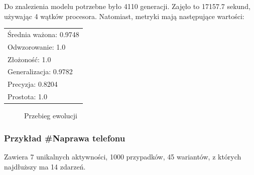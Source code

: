 Do znalezienia modelu potrzebne było 4110 generacji. Zajęło to 17157.7 sekund, używając 4 wątków procesora. Natomiast, metryki mają następujące wartości: 

 \begin{center}
  \begin{tabular}{l}
	Średnia ważona: 0.9748 \\
	Odwzorowanie: 1.0 \\
	Złożoność: 1.0 \\
	Generalizacja: 0.9782 \\
	Precyzja: 0.8204 \\
	Prostota: 1.0
  \end{tabular}
 \end{center}
 
\begin{figure}[H]
	\caption{\label{fig:flow_chart}Przebieg ewolucji}
\end{figure}

\subsubsection{Przykład \#Naprawa telefonu}
Zawiera 7 unikalnych aktywności, 1000 przypadków, 45 wariantów, z których najdłuższy ma 14 zdarzeń. 

